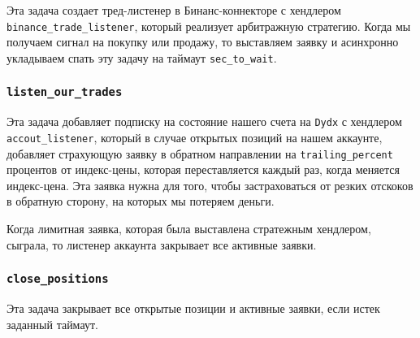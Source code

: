 Эта задача создает тред-листенер в Бинанс-коннекторе с хендлером \texttt{binance\_trade\_listener}, который реализует арбитражную стратегию. Когда мы получаем сигнал на покупку или продажу, то выставляем заявку и асинхронно укладываем спать эту задачу на таймаут \texttt{sec\_to\_wait}.


\subsubsection{\texttt{listen\_our\_trades}}

Эта задача добавляет подписку на состояние нашего счета на \texttt{Dydx} с хендлером \texttt{accout\_listener}, который в случае открытых позиций на нашем аккаунте, добавляет страхующую заявку в обратном направлении на \texttt{trailing\_percent} процентов от индекс-цены, которая переставляется каждый раз, когда меняется индекс-цена. Эта заявка нужна для того, чтобы застраховаться от резких отскоков в обратную сторону, на которых мы потеряем деньги.

Когда лимитная заявка, которая была выставлена стратежным хендлером, сыграла, то листенер аккаунта закрывает все активные заявки.

\subsubsection{\texttt{close\_positions}}

Эта задача закрывает все открытые позиции и активные заявки, если истек заданный таймаут.